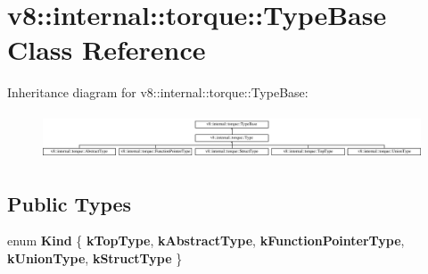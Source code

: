 \hypertarget{classv8_1_1internal_1_1torque_1_1TypeBase}{}\section{v8\+:\+:internal\+:\+:torque\+:\+:Type\+Base Class Reference}
\label{classv8_1_1internal_1_1torque_1_1TypeBase}
Inheritance diagram for v8\+:\+:internal\+:\+:torque\+:\+:Type\+Base\+:\begin{figure}[H]
\begin{center}
\leavevmode
\includegraphics[height=1.365854cm]{classv8_1_1internal_1_1torque_1_1TypeBase}
\end{center}
\end{figure}
\subsection*{Public Types}
\begin{DoxyCompactItemize}
\item 
\mbox{\label{classv8_1_1internal_1_1torque_1_1TypeBase_ac90771662b06f21e80b7fa921e50949f}} 
enum {\bfseries Kind} \{ \newline
{\bfseries k\+Top\+Type}, 
{\bfseries k\+Abstract\+Type}, 
{\bfseries k\+Function\+Pointer\+Type}, 
{\bfseries k\+Union\+Type}, 
\newline
{\bfseries k\+Struct\+Type}
 \}
\end{DoxyCompactItemize}
